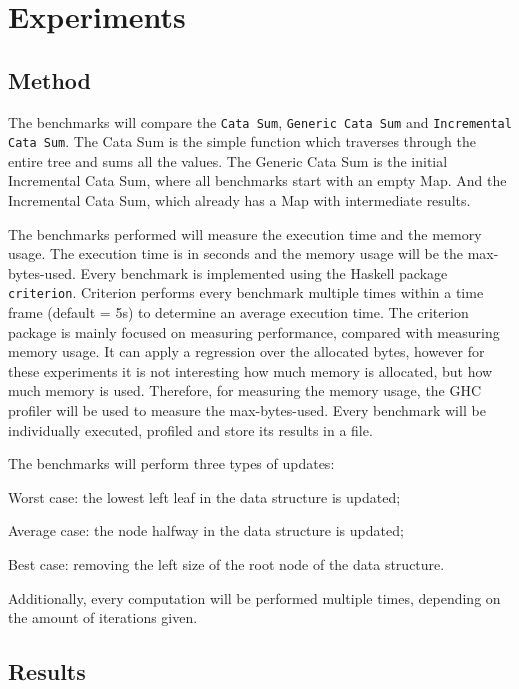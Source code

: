 \chapter{Experiments}

\section{Method}

The benchmarks will compare the \texttt{Cata Sum}, \texttt{Generic Cata Sum} and \texttt{Incremental Cata Sum}. The Cata Sum is the simple function which traverses through the entire tree and sums all the values. The Generic Cata Sum is the initial Incremental Cata Sum, where all benchmarks start with an empty Map. And the Incremental Cata Sum, which already has a Map with intermediate results.

The benchmarks performed will measure the execution time and the memory usage. The execution time is in seconds and the memory usage will be the max-bytes-used. Every benchmark is implemented using the Haskell package \texttt{criterion}\cite{hackage2022criterion}. Criterion performs every benchmark multiple times within a time frame (default = 5s) to determine an average execution time. The criterion package is mainly focused on measuring performance, compared with measuring memory usage. It can apply a regression over the allocated bytes, however for these experiments it is not interesting how much memory is allocated, but how much memory is used. Therefore, for measuring the memory usage, the GHC profiler\cite*{ghc2022memoryprofiling} will be used to measure the max-bytes-used. Every benchmark will be individually executed, profiled and store its results in a file. 


The benchmarks will perform three types of updates: 
\begin{enumerate*}[label=(\arabic*)]
  \item Worst case: the lowest left leaf in the data structure is updated;
  \item Average case: the node halfway in the data structure is updated;
  \item Best case: removing the left size of the root node of the data structure.
\end{enumerate*} Additionally, every computation will be performed multiple times, depending on the amount of iterations given.

\section{Results}

